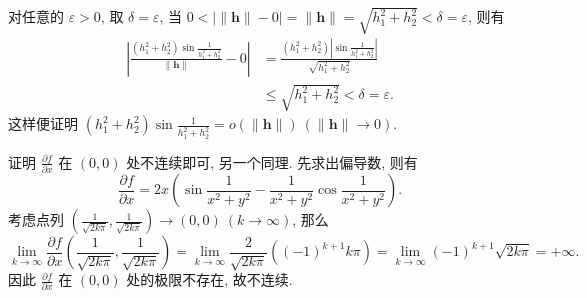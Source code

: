 \begin{enumerate}
        对任意的 $\varepsilon > 0$, 取 $\delta = \varepsilon$, 当 $0 < |\|\boldsymbol{h}\| - 0| = \|\boldsymbol{h}\| = \sqrt{h_1^2 + h_2^2} < \delta = \varepsilon$, 则有
        \begin{align*}
            \left| \frac{(h_1^2 + h_2^2)\sin\frac{1}{h_1^2 + h_2^2}}{\|\boldsymbol{h}\|} - 0 \right| &= \frac{(h_1^2 + h_2^2)|\sin\frac{1}{h_1^2 + h_2^2}|}{\sqrt{h_1^2 + h_2^2}} \\
            &\leqslant \sqrt{h_1^2 + h_2^2} < \delta = \varepsilon.    
        \end{align*}
        这样便证明 $(h_1^2 + h_2^2)\sin\frac{1}{h_1^2 + h_2^2} = o(\|\boldsymbol{h}\|)\ (\|\boldsymbol{h}\|\to0)$.

        证明 $\frac{\partial f}{\partial x}$ 在 $(0, 0)$ 处不连续即可, 另一个同理. 先求出偏导数, 则有
        \[
            \frac{\partial f}{\partial x} = 2x\left(\sin\frac{1}{x^2+y^2} - \frac{1}{x^2+y^2}\cos\frac{1}{x^2+y^2}\right).   
        \]
        考虑点列 $\displaystyle{\left(\frac{1}{\sqrt{2k\pi}}, \frac{1}{\sqrt{2k\pi}}\right) \to (0,0)\ (k\to\infty)}$, 那么
        \[
            \lim_{k\to\infty} \frac{\partial f}{\partial x}\left(\frac{1}{\sqrt{2k\pi}}, \frac{1}{\sqrt{2k\pi}}\right) = \lim_{k\to\infty}\frac{2}{\sqrt{2k\pi}}((-1)^{k+1}k\pi) = \lim_{k\to\infty}(-1)^{k+1}\sqrt{2k\pi} = +\infty.   
        \]
        因此 $\frac{\partial f}{\partial x}$ 在 $(0, 0)$ 处的极限不存在, 故不连续.
\end{enumerate}
% 
